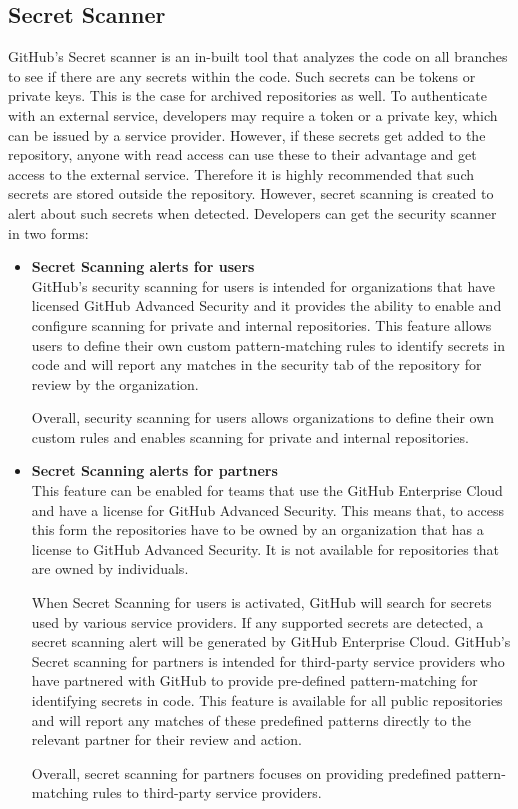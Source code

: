 \subsection{Secret Scanner}
GitHub's Secret scanner is an in-built tool that analyzes the code on all branches to see if there are any secrets within the code. Such secrets can be tokens or private keys. This is the case for archived repositories as well. To authenticate with an external service, developers may require a token or a private key, which can be issued by a service provider. However, if these secrets get added to the repository, anyone with read access can use these to their advantage and get access to the external service. Therefore it is highly recommended that such secrets are stored outside the repository. However, secret scanning is created to alert about such secrets when detected. Developers can get the
security scanner in two forms\cite{GithubSecretScanning}: 
\begin{itemize}
    \item \textbf{Secret Scanning alerts for users}\\
GitHub's security scanning for users is intended for organizations that have licensed GitHub Advanced Security and it provides the ability to enable and configure scanning for private and internal repositories. This feature allows users to define their own custom pattern-matching rules to identify secrets in code and will report any matches in the security tab of the repository for review by the organization. 

Overall, security scanning for users allows organizations to define their own custom rules and enables scanning for private and internal repositories.

\item \textbf{Secret Scanning alerts for partners}\\
This feature can be enabled for teams that use the GitHub Enterprise Cloud and have a license for GitHub Advanced Security. This means that, to access this form the repositories have to be owned by an organization that has a license to GitHub Advanced Security. It is not available for repositories that are owned by individuals. 

When Secret Scanning for users is activated, GitHub will search for secrets used by various service providers. If any supported secrets are detected, a secret scanning alert will be generated by GitHub Enterprise Cloud.
GitHub's Secret scanning for partners is intended for third-party service providers who have partnered with GitHub to provide pre-defined pattern-matching for identifying secrets in code. This feature is available for all public repositories and will report any matches of these predefined patterns directly to the relevant partner for their review and action. 

Overall, secret scanning for partners focuses on providing predefined pattern-matching rules to third-party service providers. 
\end{itemize}
